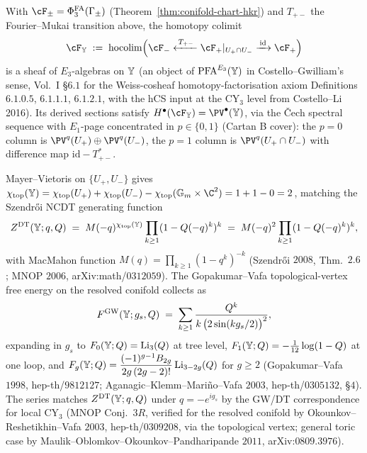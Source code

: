 \begin{theorem}
\label{thm:conifold-E3-cech-gluing}
With $\cF_\pm = \PhiFA_3(\Gamma_\pm)$ (Theorem~\ref{thm:conifold-chart-hkr}) and $T_{+-}$ the Fourier--Mukai transition above, the homotopy colimit
\[
 \cF_{\bY} \;:=\; \mathrm{hocolim}\Bigl(\cF_- \xleftarrow{\,T_{+-}\,} \cF_+|_{U_+ \cap U_-} \xrightarrow{\,\mathrm{id}\,} \cF_+\Bigr)
\]
is a sheaf of $E_3$-algebras on $\mathbb{Y}$ (an object of $\mathrm{PFA}^{E_3}(\mathbb{Y})$ in Costello--Gwilliam's sense, Vol.~I \S$6.1$ for the Weiss-cosheaf homotopy-factorisation axiom Definitions~$6.1.0.5$, $6.1.1.1$, $6.1.2.1$, with the hCS input at the CY$_3$ level from Costello--Li 2016). Its derived sections satisfy $H^\bullet(\cF_{\bY}) = \PV^\bullet(\bY)$, via the \v{C}ech spectral sequence with $E_1$-page concentrated in $p \in \{0, 1\}$ (Cartan B cover): the $p = 0$ column is $\PV^q(U_+) \oplus \PV^q(U_-)$, the $p = 1$ column is $\PV^q(U_+ \cap U_-)$ with difference map $\mathrm{id} - T_{+-}^*$.
\end{theorem}

Mayer--Vietoris on $\{U_+, U_-\}$ gives $\chi_{\mathrm{top}}(\bY) = \chi_{\mathrm{top}}(U_+) + \chi_{\mathrm{top}}(U_-) - \chi_{\mathrm{top}}(\Gm \times \C^2) = 1 + 1 - 0 = 2$, matching the Szendr\H{o}i NCDT generating function
\[
 Z^{\mathrm{DT}}(\mathbb{Y}; q, Q) \;=\; M(-q)^{\chi_{\mathrm{top}}(\mathbb{Y})} \prod_{k \geq 1}(1 - Q(-q)^k)^k \;=\; M(-q)^2 \prod_{k \geq 1}(1 - Q(-q)^k)^k,
\]
with MacMahon function $M(q) = \prod_{k \geq 1}(1 - q^k)^{-k}$ (Szendr\H{o}i $2008$, Thm.~$2.6$; MNOP $2006$, arXiv:math/$0312059$). The Gopakumar--Vafa topological-vertex free energy on the resolved conifold collects as
\[
 F^{\mathrm{GW}}(\mathbb{Y}; g_s, Q) \;=\; \sum_{k \geq 1} \frac{Q^k}{k\,\bigl(2\sin(k g_s/2)\bigr)^2},
\]
expanding in $g_s$ to $F_0(\mathbb{Y}; Q) = \mathrm{Li}_3(Q)$ at tree level, $F_1(\mathbb{Y}; Q) = -\tfrac{1}{12}\log(1-Q)$ at one loop, and $F_g(\mathbb{Y}; Q) = \dfrac{(-1)^{g-1} B_{2g}}{2g\,(2g-2)!}\, \mathrm{Li}_{3-2g}(Q)$ for $g \geq 2$ (Gopakumar--Vafa $1998$, hep-th/$9812127$; Aganagic--Klemm--Mari\~no--Vafa $2003$, hep-th/$0305132$, \S$4$). The series matches $Z^{\mathrm{DT}}(\mathbb{Y}; q, Q)$ under $q = -e^{i g_s}$ by the GW/DT correspondence for local $\mathrm{CY}_3$ (MNOP Conj.~$3R$, verified for the resolved conifold by Okounkov--Reshetikhin--Vafa $2003$, hep-th/$0309208$, via the topological vertex; general toric case by Maulik--Oblomkov--Okounkov--Pandharipande $2011$, arXiv:$0809.3976$).

